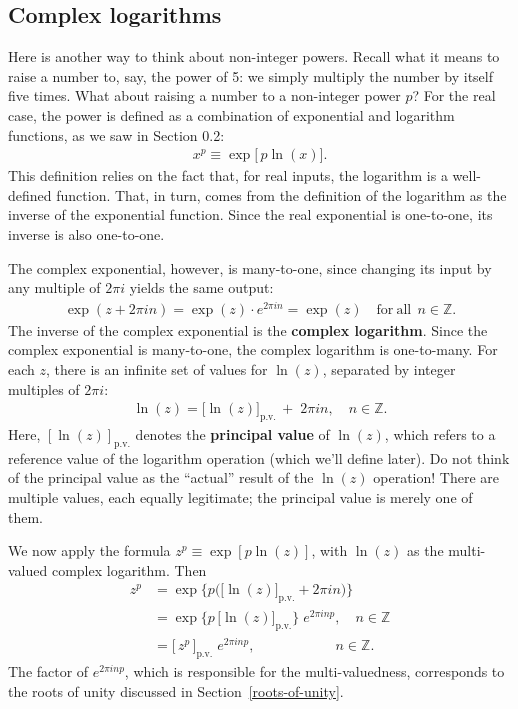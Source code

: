 \documentclass[10pt,a4paper]{article}
\begin{document}
\clearpage

\subsection{Complex logarithms}\label{complex-logarithms}

Here is another way to think about non-integer powers.  Recall what it
means to raise a number to, say, the power of 5: we simply multiply
the number by itself five times.  What about raising a number to a
non-integer power $p$?  For the real case, the power is defined as a
combination of exponential and logarithm functions, as we saw in
Section 0.2:
\begin{align}
  x^p \equiv \exp\!\big[\,p\ln(x)\big].
\end{align}
This definition relies on the fact that, for real inputs, the
logarithm is a well-defined function.  That, in turn, comes from the
definition of the logarithm as the inverse of the exponential
function. Since the real exponential is one-to-one, its inverse is
also one-to-one.

The complex exponential, however, is many-to-one, since changing its
input by any multiple of $2\pi i$ yields the same output:
\begin{align}
  \exp(z + 2\pi i n) = \exp(z) \cdot e^{2\pi i n} = \exp(z) \quad \mathrm{for~all}\;\, n \in \mathbb{Z}.
\end{align}
The inverse of the complex exponential is the \textbf{complex
  logarithm}. Since the complex exponential is many-to-one, the
complex logarithm is one-to-many.  For each $z$, there is an infinite
set of values for $\ln(z)$, separated by integer multiples of $2\pi
i$:
\begin{align}
  \ln(z) = \big[\ln(z)\big]_{\mathrm{p.v.}}\, +\; 2 \pi i n, \quad n \in \mathbb{Z}.
\end{align}
Here, $[\ln(z)]_{\mathrm{p.v.}}$ denotes the \textbf{principal value}
of $\ln(z)$, which refers to a reference value of the logarithm
operation (which we'll define later).  Do not think of the principal
value as the ``actual'' result of the $\ln(z)$ operation! There are
multiple values, each equally legitimate; the principal value is
merely one of them.

We now apply the formula $z^p \equiv \exp\left[p\ln(z)\right]$, with
$\ln(z)$ as the multi-valued complex logarithm. Then
\begin{align}
  z^p &= \exp\Big\{p\big(\big[\ln(z)\big]_{\mathrm{p.v.}} + 2\pi i n\big)\Big\}\\
  &= \exp\Big\{p\,\big[\ln(z)\big]_{\mathrm{p.v.}}\Big\} \; e^{2\pi i np}, \quad n \in \mathbb{Z}\\
  &= \big[\,z^p\,\big]_{\mathrm{p.v.}} \; e^{2\pi i np}, \quad\qquad\qquad\;\;\, n \in \mathbb{Z}.
\end{align}
The factor of $e^{2\pi i np}$, which is responsible for the
multi-valuedness, corresponds to the roots of unity discussed in
Section~\ref{roots-of-unity}.
\end{document}
